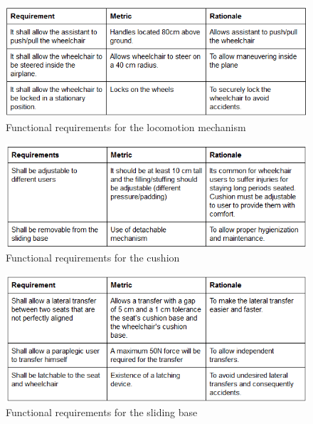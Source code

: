 \newpage

\begin{figure}[h!]
  \centering
     \includegraphics[scale=1]{images/functional_requirements_locomotion_mechanism.png}
   \caption{Functional requirements for the locomotion mechanism}
  \label{fig:fun_req_locomotion_mechanism}
\end{figure}

\newpage

\begin{figure}[h!]
  \centering
     \includegraphics[scale=1]{images/functional_requirements_cushion.png}
   \caption{Functional requirements for the cushion}
  \label{fig:fun_req_cushion}
\end{figure}

\newpage

\begin{figure}[h!]
  \centering
     \includegraphics[scale=1]{images/functional_requirements_sliding_base.png}
   \caption{Functional requirements for the sliding base}
  \label{fig:fun_req_sliding_base}
\end{figure}

